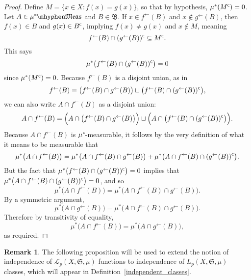 \documentclass[
twoside=true,
paper=letter,
fontsize=9pt,
pagesize=auto,
leqno,
openany,
headsepline,
overfullrule,
]{scrbook}
\theoremstyle{plain}
\theoremstyle{plain}
\theoremstyle{definition}
\newtheorem{rmk}[thm]{Remark}
\theoremstyle{bfnoteitalic}
\theoremstyle{bfnoteroman}
\newcommand{\sigalg}[1]{\mathfrak{#1}}
\newcommand{\cali}[1]{\mathscr{#1}}
\newcommand{\comp}{^{\hbox{\tiny{$\mathsf C$}}}}
\newcommand{\preimage}[1]{#1^{\leftarrow}}
\newcommand{\meets}{\cap}
\newcommand{\semiring}{\sigalg{S}}
\newcommand{\sigmaalgebraii}{\sigalg{B}}
\newcommand{\measurable}[1]{{#1}\mhyphen\mathfrak{Meas}}
\newcommand{\kernast}{\ast\kern-1pt}
\newcommand{\measurespace}{X}
\newcommand{\mspaceelt}{x}
\newcommand{\measure}{\mu}
\begin{document}
\begin{proof}
Define $M=\{\mspaceelt\in\measurespace : f(\mspaceelt) = g(\mspaceelt)\}$, so that  by hypothesis,
$\measure^*(M\comp) = 0$. Let $A\in \measurable{\measure^\kernast}$ and $B\in\sigmaalgebraii$.
If $\mspaceelt\in\preimage{f}(B)$ and $\mspaceelt\notin\preimage{g}(B)$, then 
$f(\mspaceelt)\in B$ and $g(\mspaceelt)\in B\comp$, implying 
$f(\mspaceelt)\neq g(\mspaceelt)$ and $\mspaceelt\notin M$, meaning 
\[
\preimage{f}(B)\meets (\preimage{g}(B))\comp 
\subseteq 
M\comp.
\]
This says 
\[
\measure^*\bigl(\preimage{f}(B)\meets (\preimage{g}(B))\comp\bigr) = 0
\]
since $\measure^*(M\comp)=0$. 
Because $\preimage{f}(B)$ is a disjoint union, as in
\[
\preimage{f}(B)
=
\bigl(\preimage{f}(B) \meets \preimage{g}(B)\bigr) 
\sqcup
\bigl(\preimage{f}(B) \meets (\preimage{g}(B))\comp\bigr),
\]
we can also write $A\meets\preimage{f}(B)$ as a disjoint union:
\[
A\meets \preimage{f}(B)
=
\Bigl(A\meets\bigl(\preimage{f}(B) \meets \preimage{g}(B)\bigr) \Bigr)
\sqcup
\Bigl(A\meets\bigl(\preimage{f}(B) \meets (\preimage{g}(B))\comp\bigr)\Bigr).
\]
Because $A\meets\preimage{f}(B)$ is $\measure^\kernast$-measurable, it follows by the very definition of what it means to be measurable that
\[
\measure^*\bigl(A\meets \preimage{f}(B)\bigr)
=
\measure^*\bigl(A\meets\preimage{f}(B) \meets \preimage{g}(B)\bigr)
+
\measure^*\bigl(A\meets\preimage{f}(B) \meets (\preimage{g}(B))\comp\bigr).
\]
But the fact that $\measure^*\bigl(\preimage{f}(B)\meets (\preimage{g}(B))\comp\bigr) = 0$
implies that 
$\measure^*\bigl(A\meets\preimage{f}(B)\meets (\preimage{g}(B))\comp\bigr) = 0$,
and so 
\[
\measure^*\bigl(A\meets\preimage{f}(B)\bigr)
=
\measure^*\bigl(A\meets\preimage{f}(B) \meets \preimage{g}(B)\bigr).
\]
By a symmetric argument, 
\[
\measure^*\bigl(A\meets\preimage{g}(B)\bigr)
=
\measure^*\bigl(A\meets\preimage{f}(B) \meets \preimage{g}(B)\bigr).
\]
Therefore by transitivity of equality,
\[
\measure^*\bigl(A\meets\preimage{f}(B)\bigr)
=
\measure^*\bigl(A\meets\preimage{g}(B)\bigr),
\]
as required.
\end{proof}


\begin{rmk}
The following proposition will be used to extend the notion of independence of 
$\cali{L}_p(\measurespace, \semiring, \measure)$
functions to independence of 
$L_p(\measurespace, \semiring, \measure)$
classes, which will appear in Definition~\ref{independent_classes}.
\end{rmk}
\end{document}
